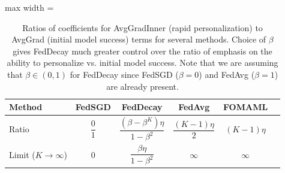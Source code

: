 \begin{table}[htbp]
    \centering

    \begin{adjustbox}{max width = \linewidth}
        \begin{tabular}{|l|c|c|c|c|c|}
        \hline
            Method & FedSGD & \textbf{FedDecay} & FedAvg & FOMAML \\
            \hline
            Ratio & 
                $\dfrac{0}{1}$ &
                $\dfrac{\left( \beta - \beta^{K} \right) \eta}{1 - \beta^2}$ & 
                $\dfrac{(K - 1)\eta}{2}$ &
                $(K - 1)\eta$ \\
            Limit ($K \rightarrow \infty$) & 
                0 & 
                $\dfrac{\beta \eta}{1 - \beta^2}$ &
                $\infty$ &
                $\infty$ \\
            \hline
        \end{tabular}
    \end{adjustbox}

    \caption{
        Ratios of coefficients for AvgGradInner (rapid personalization) to AvgGrad (initial model success) terms for several methods. 
        Choice of $\beta$ gives FedDecay much greater control over the ratio of emphasis on the ability to personalize vs. initial model success.
        Note that we are assuming that $\beta \in (0, 1)$ for FedDecay since FedSGD ($\beta = 0$) and FedAvg ($\beta = 1$) are already present.
    }
    \label{tab: gradient--ratios}
\end{table}

